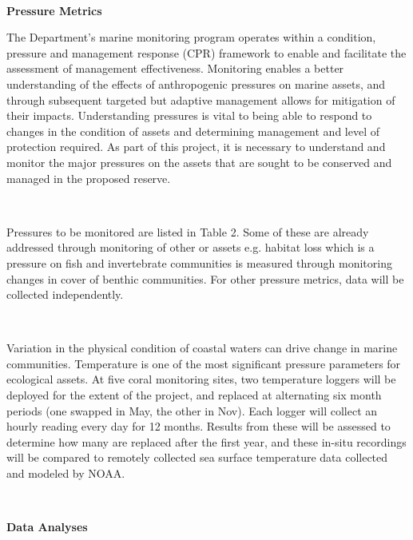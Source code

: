 \documentclass[version=last,
    paper=a4,                               %
    10pt,                                   %
    dvipsnames,
    oneside,                              %
    headings=openany,                       %
    open=any,
    BCOR=7mm,                               %
    DIV=15,     %
]{scrbook}
\begin{document}
~

\textbf{Pressure Metrics}

The Department's marine monitoring program operates within a condition,
pressure and management response (CPR) framework to enable and
facilitate the assessment of management effectiveness. Monitoring
enables a better understanding of the effects of anthropogenic pressures
on marine assets, and through subsequent targeted but adaptive
management allows for mitigation of their impacts. Understanding
pressures is vital to being able to respond to changes in the condition
of assets and determining management and level of protection required.
As part of this project, it is necessary to understand and monitor the
major pressures on the assets that are sought to be conserved and
managed in the proposed reserve.

~

Pressures to be monitored are listed in Table 2. Some of these are
already addressed through monitoring of other or assets e.g. habitat
loss which is a pressure on fish and invertebrate communities is
measured through monitoring changes in cover of benthic communities. For
other pressure metrics, data will be collected independently.

~

Variation in the physical condition of coastal waters can drive change
in marine communities. Temperature is one of the most significant
pressure parameters for ecological assets. At five coral monitoring
sites, two temperature loggers will be deployed for the extent of the
project, and replaced at alternating six month periods (one swapped in
May, the other in Nov). Each logger will collect an hourly reading every
day for 12 months. Results from these will be assessed to determine how
many are replaced after the first year, and these in-situ recordings
will be compared to remotely collected sea surface temperature data
collected and modeled by NOAA.

~

\textbf{Data Analyses}
\end{document}
